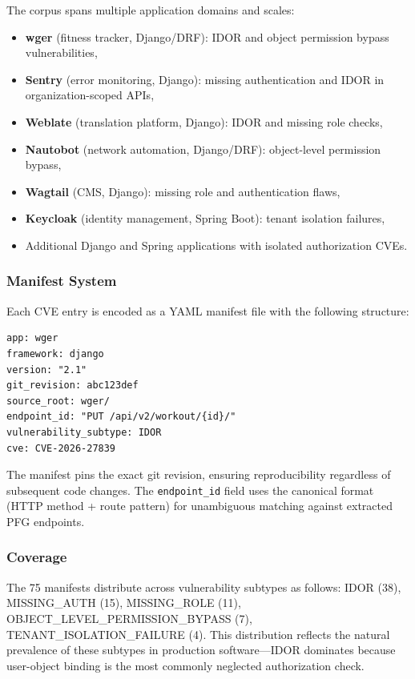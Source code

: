 The corpus spans multiple application domains and scales:
\begin{itemize}
    \item \textbf{wger} (fitness tracker, Django/DRF): IDOR and object permission bypass vulnerabilities,
    \item \textbf{Sentry} (error monitoring, Django): missing authentication and IDOR in organization-scoped APIs,
    \item \textbf{Weblate} (translation platform, Django): IDOR and missing role checks,
    \item \textbf{Nautobot} (network automation, Django/DRF): object-level permission bypass,
    \item \textbf{Wagtail} (CMS, Django): missing role and authentication flaws,
    \item \textbf{Keycloak} (identity management, Spring Boot): tenant isolation failures,
    \item Additional Django and Spring applications with isolated authorization CVEs.
\end{itemize}

\subsubsection{Manifest System}

Each CVE entry is encoded as a YAML manifest file with the following structure:
\begin{lstlisting}[basicstyle=\small\ttfamily, frame=single]
app: wger
framework: django
version: "2.1"
git_revision: abc123def
source_root: wger/
endpoint_id: "PUT /api/v2/workout/{id}/"
vulnerability_subtype: IDOR
cve: CVE-2026-27839
\end{lstlisting}

The manifest pins the exact git revision, ensuring reproducibility regardless of subsequent code changes. The \texttt{endpoint\_id} field uses the canonical format (HTTP method + route pattern) for unambiguous matching against extracted PFG endpoints.

\subsubsection{Coverage}

The 75 manifests distribute across vulnerability subtypes as follows: IDOR (38), MISSING\_AUTH (15), MISSING\_ROLE (11), OBJECT\_LEVEL\_PERMISSION\_BYPASS (7), TENANT\_ISOLATION\_FAILURE (4). This distribution reflects the natural prevalence of these subtypes in production software—IDOR dominates because user-object binding is the most commonly neglected authorization check.

